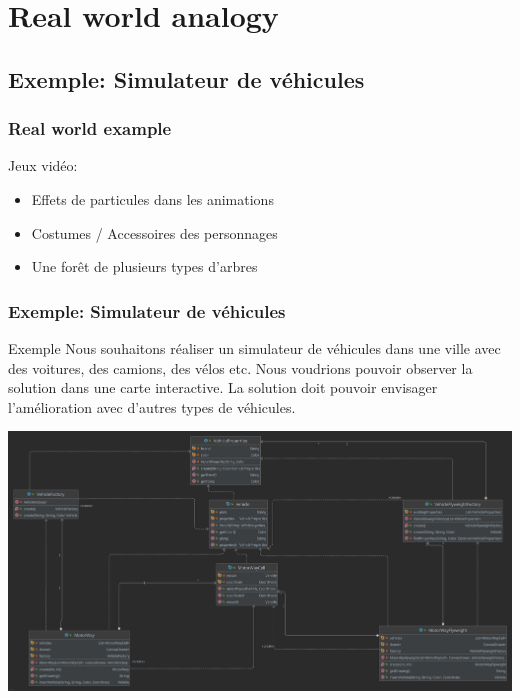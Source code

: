 \documentclass{beamer}
\begin{document}
\section{Real world analogy}

\subsection{Exemple: Simulateur de véhicules}

\begin{frame}
\frametitle{Real world example}

Jeux vidéo:
\begin{itemize}
\item Effets de particules dans les animations
\item Costumes / Accessoires des personnages
\item Une forêt de plusieurs types d'arbres
\end{itemize}
\end{frame}


\begin{frame}
\frametitle{Exemple: Simulateur de véhicules}
\begin{block}{Exemple}
Nous souhaitons réaliser un simulateur de véhicules dans une ville avec des voitures, des camions, des vélos etc.
Nous voudrions pouvoir observer la solution dans une carte interactive.
La solution doit pouvoir envisager l'amélioration avec d'autres types de véhicules.
\end{block}
\end{frame}


\begin{frame}
\includegraphics[scale=0.09]{FlyWeightFactories.png}
\end{frame}
\end{document}
